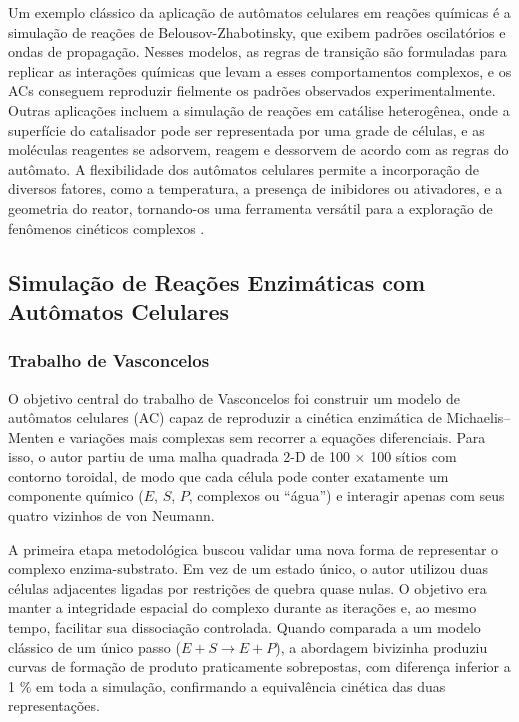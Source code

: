 \documentclass[12pt,oneside]{report}
\begin{document}
Um exemplo clássico da aplicação de autômatos celulares em reações químicas é a simulação de reações de Belousov-Zhabotinsky, que exibem padrões oscilatórios e ondas de propagação. Nesses modelos, as regras de transição são formuladas para replicar as interações químicas que levam a esses comportamentos complexos, e os ACs conseguem reproduzir fielmente os padrões observados experimentalmente. Outras aplicações incluem a simulação de reações em catálise heterogênea, onde a superfície do catalisador pode ser representada por uma grade de células, e as moléculas reagentes se adsorvem, reagem e dessorvem de acordo com as regras do autômato. A flexibilidade dos autômatos celulares permite a incorporação de diversos fatores, como a temperatura, a presença de inibidores ou ativadores, e a geometria do reator, tornando-os uma ferramenta versátil para a exploração de fenômenos cinéticos complexos \cite{kier2005}.

\subsection{Simulação de Reações Enzimáticas com Autômatos Celulares}

\subsubsection{Trabalho de Vasconcelos}

O objetivo central do trabalho de Vasconcelos \cite{vasconcelos2019} foi construir um modelo de autômatos celulares (AC) capaz de reproduzir a cinética enzimática de Michaelis–Menten e variações mais complexas sem recorrer a equações diferenciais. Para isso, o autor partiu de uma malha quadrada 2-D de 100 × 100 sítios com contorno toroidal, de modo que cada célula pode conter exatamente um componente químico ($E$, $S$, $P$, complexos ou “água”) e interagir apenas com seus quatro vizinhos de von Neumann.

A primeira etapa metodológica buscou validar uma nova forma de representar o complexo enzima-substrato. Em vez de um estado único, o autor utilizou duas células adjacentes ligadas por restrições de quebra quase nulas. O objetivo era manter a integridade espacial do complexo durante as iterações e, ao mesmo tempo, facilitar sua dissociação controlada. Quando comparada a um modelo clássico de um único passo ($E + S \rightarrow E + P$), a abordagem bivizinha produziu curvas de formação de produto praticamente sobrepostas, com diferença inferior a 1 $\%$ em toda a simulação, confirmando a equivalência cinética das duas representações.
\end{document}
